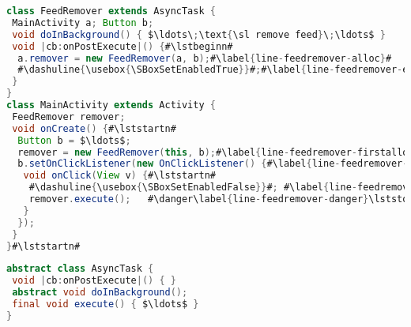 \documentclass[10pt,reprint,nocopyrightspace,numbers]{sigplanconf}
\begin{document}

\newsavebox{\SBoxSetEnabledTrue}
\begin{lrbox}{\SBoxSetEnabledTrue}\small
{}
\end{lrbox}
\newsavebox{\SBoxSetEnabledFalse}
\begin{lrbox}{\SBoxSetEnabledFalse}\small
{}
\end{lrbox}
\newsavebox{\SBoxFeedRemoverExample}
\begin{lrbox}{\SBoxFeedRemoverExample}\small
\lststopn\begin{lstlisting}[language=Java,alsolanguage=exthighlighting,style=number]
class FeedRemover extends AsyncTask {
 MainActivity a; Button b;
 void doInBackground() { $\ldots\;\text{\sl remove feed}\;\ldots$ }
 void |cb:onPostExecute|() {#\lstbeginn#
  a.remover = new FeedRemover(a, b);#\label{line-feedremover-alloc}#
  #\dashuline{\usebox{\SBoxSetEnabledTrue}}#;#\label{line-feedremover-enable}\lststopn#
 }
}
class MainActivity extends Activity {
 FeedRemover remover;
 void onCreate() {#\lststartn#
  Button b = $\ldots$;
  remover = new FeedRemover(this, b);#\label{line-feedremover-firstalloc}#
  b.setOnClickListener(new OnClickListener() {#\label{line-feedremover-listener}\lststopn#
   void onClick(View v) {#\lststartn#
    #\dashuline{\usebox{\SBoxSetEnabledFalse}}#; #\label{line-feedremover-disable}#
    remover.execute();   #\danger\label{line-feedremover-danger}\lststopn#
   }
  });
 }
}#\lststartn#
\end{lstlisting}
\end{lrbox}
%
\newsavebox{\SBoxAsyncTaskInterface}
\begin{lrbox}{\SBoxAsyncTaskInterface}\small
\begin{lstlisting}[language=Java,alsolanguage=exthighlighting]
abstract class AsyncTask {
 void |cb:onPostExecute|() { }
 abstract void doInBackground();
 final void execute() { $\ldots$ }
}
\end{lstlisting}
\end{lrbox}
%
\newsavebox{\SBoxAsyncExecute}
\newsavebox{\SBoxAsyncExecuteNoType}
\end{document}
